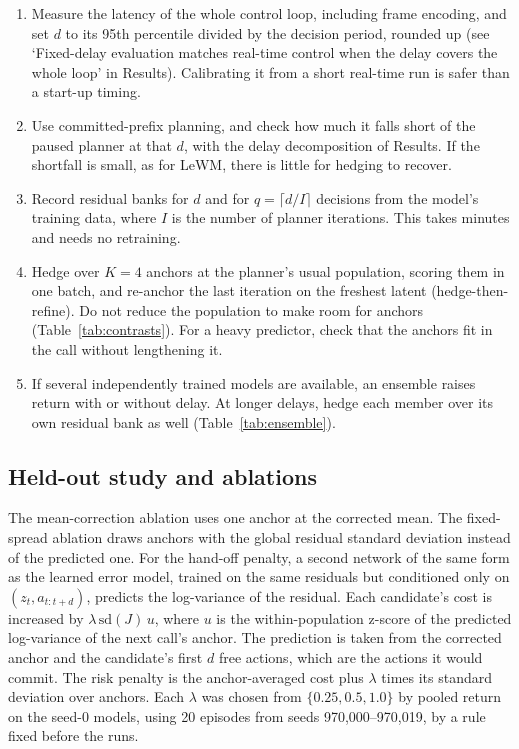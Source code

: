 \documentclass[aps,physrev,\manuscriptlayout,superscriptaddress,
  longbibliography,amsmath,amssymb]{revtex4-2}
\begin{document}
\begin{enumerate}
\item Measure the latency of the whole control loop, including frame encoding, and set $d$ to its 95th percentile divided by the decision period, rounded up (see `Fixed-delay evaluation matches real-time control when the delay covers the whole loop' in Results). Calibrating it from a short real-time run is safer than a start-up timing.
\item Use committed-prefix planning, and check how much it falls short of the paused planner at that $d$, with the delay decomposition of Results. If the shortfall is small, as for LeWM, there is little for hedging to recover.
\item Record residual banks for $d$ and for $q=\lceil d/I\rceil$ decisions from the model's training data, where $I$ is the number of planner iterations. This takes minutes and needs no retraining.
\item Hedge over $K=4$ anchors at the planner's usual population, scoring them in one batch, and re-anchor the last iteration on the freshest latent (hedge-then-refine). Do not reduce the population to make room for anchors (Table~\ref{tab:contrasts}). For a heavy predictor, check that the anchors fit in the call without lengthening it.
\item If several independently trained models are available, an ensemble raises return with or without delay. At longer delays, hedge each member over its own residual bank as well (Table~\ref{tab:ensemble}).
\end{enumerate}

\subsection{Held-out study and ablations}\label{sec:heldout-methods}

The mean-correction ablation uses one anchor at the corrected mean. The fixed-spread ablation draws anchors with the global residual standard deviation instead of the predicted one. For the hand-off penalty, a second network of the same form as the learned error model, trained on the same residuals but conditioned only on $(z_t, a_{t:t+d})$, predicts the log-variance of the residual. Each candidate's cost is increased by $\lambda\,\mathrm{sd}(J)\,u$, where $u$ is the within-population z-score of the predicted log-variance of the next call's anchor. The prediction is taken from the corrected anchor and the candidate's first $d$ free actions, which are the actions it would commit. The risk penalty is the anchor-averaged cost plus $\lambda$ times its standard deviation over anchors. Each $\lambda$ was chosen from $\{0.25, 0.5, 1.0\}$ by pooled return on the seed-0 models, using 20 episodes from seeds 970,000--970,019, by a rule fixed before the runs.
\end{document}

